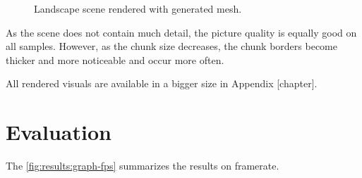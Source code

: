 \begin{figure}[h]
    \caption{Landscape scene rendered with generated mesh.}
\end{figure}

As the scene does not contain much detail, the picture quality is equally good on all samples. However, as the chunk size decreases, the chunk borders become thicker and more noticeable and occur more often.

All rendered visuals are available in a bigger size in Appendix [chapter].

\section{Evaluation}

The \autoref{fig:results:graph-fps} summarizes the results on framerate.

\begin{figure}[h]
    \centering
    

\end{figure}
